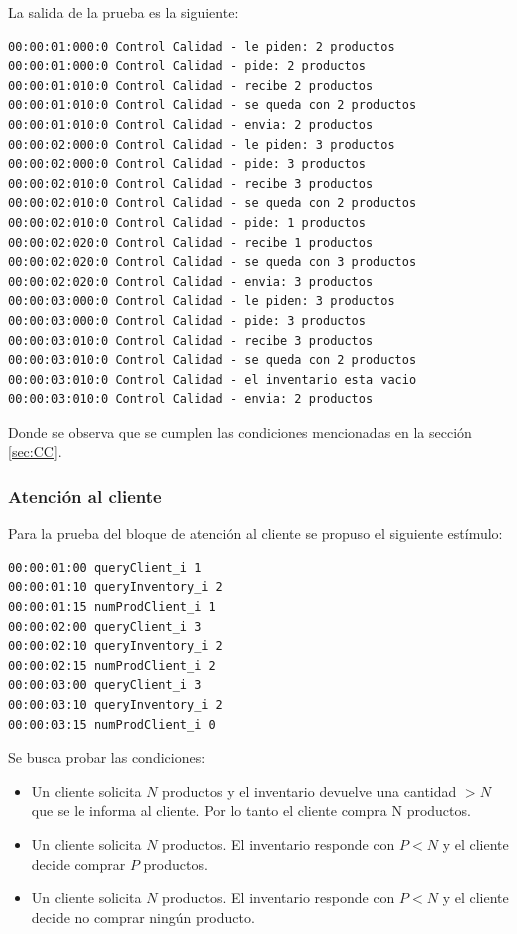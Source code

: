 \documentclass[10pt]{article}
\begin{document}
La salida de la prueba es la siguiente:

\begin{minipage}{1\textwidth}
	\centering
	\begin{lstlisting}
00:00:01:000:0 Control Calidad - le piden: 2 productos
00:00:01:000:0 Control Calidad - pide: 2 productos
00:00:01:010:0 Control Calidad - recibe 2 productos
00:00:01:010:0 Control Calidad - se queda con 2 productos
00:00:01:010:0 Control Calidad - envia: 2 productos
00:00:02:000:0 Control Calidad - le piden: 3 productos
00:00:02:000:0 Control Calidad - pide: 3 productos
00:00:02:010:0 Control Calidad - recibe 3 productos
00:00:02:010:0 Control Calidad - se queda con 2 productos
00:00:02:010:0 Control Calidad - pide: 1 productos
00:00:02:020:0 Control Calidad - recibe 1 productos
00:00:02:020:0 Control Calidad - se queda con 3 productos
00:00:02:020:0 Control Calidad - envia: 3 productos
00:00:03:000:0 Control Calidad - le piden: 3 productos
00:00:03:000:0 Control Calidad - pide: 3 productos
00:00:03:010:0 Control Calidad - recibe 3 productos
00:00:03:010:0 Control Calidad - se queda con 2 productos
00:00:03:010:0 Control Calidad - el inventario esta vacio
00:00:03:010:0 Control Calidad - envia: 2 productos
	\end{lstlisting}
	
\end{minipage}
Donde se observa que se cumplen las condiciones mencionadas en la sección \ref{sec:CC}.

\subsubsection{Atención al cliente}
Para la prueba del bloque de atención al cliente se propuso el siguiente estímulo:

\begin{minipage}{1\textwidth}
	\centering
	\begin{lstlisting}
00:00:01:00	queryClient_i 1
00:00:01:10 queryInventory_i 2
00:00:01:15 numProdClient_i 1
00:00:02:00	queryClient_i 3
00:00:02:10 queryInventory_i 2
00:00:02:15 numProdClient_i 2
00:00:03:00	queryClient_i 3
00:00:03:10 queryInventory_i 2
00:00:03:15 numProdClient_i 0
	\end{lstlisting}
\end{minipage}

Se busca probar las condiciones:
\begin{itemize}
	\item Un cliente solicita $N$ productos y el inventario devuelve una cantidad $> N$ que se le informa al cliente. Por lo tanto el cliente compra N productos.
	\item Un cliente solicita $N$ productos. El inventario responde con $P < N$ y el cliente decide comprar $P$ productos.
	\item Un cliente solicita $N$ productos. El inventario responde con $P < N$ y el cliente decide no comprar ningún producto.
\end{itemize}
\end{document}
